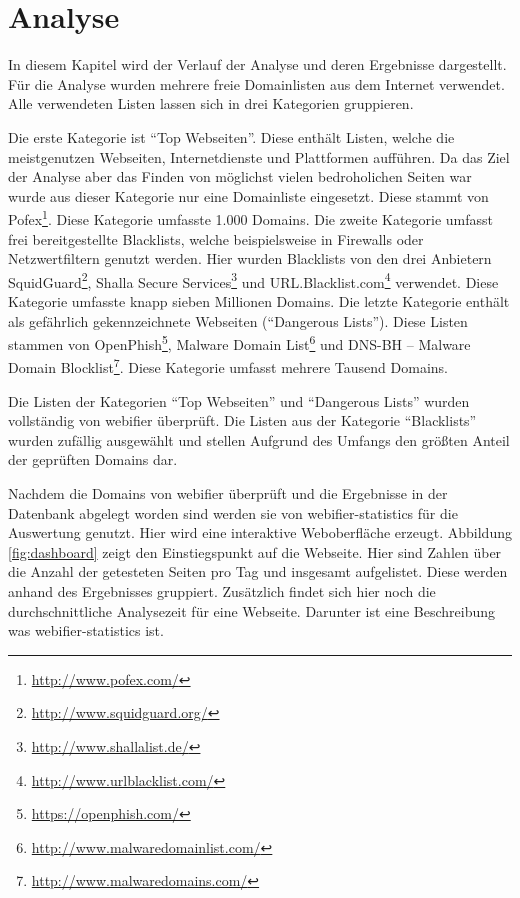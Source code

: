 \chapter{Analyse}

In diesem Kapitel wird der Verlauf der Analyse und deren Ergebnisse dargestellt. Für die Analyse wurden mehrere freie Domainlisten aus dem Internet verwendet. Alle verwendeten Listen lassen sich in drei Kategorien gruppieren.

Die erste Kategorie ist \enquote{Top Webseiten}. Diese enthält Listen, welche die meistgenutzen Webseiten, Internetdienste und Plattformen aufführen. Da das Ziel der Analyse aber das Finden von möglichst vielen bedroholichen Seiten war wurde aus dieser Kategorie nur eine Domainliste eingesetzt. Diese stammt von Pofex\footnote{\url{http://www.pofex.com/}}. Diese Kategorie umfasste 1.000 Domains. Die zweite Kategorie umfasst frei bereitgestellte Blacklists, welche beispielsweise in Firewalls oder Netzwertfiltern genutzt werden. Hier wurden Blacklists von den drei Anbietern SquidGuard\footnote{\url{http://www.squidguard.org/}}, Shalla Secure Services\footnote{\url{http://www.shallalist.de/}} und URL.Blacklist.com\footnote{\url{http://www.urlblacklist.com/}} verwendet. Diese Kategorie umfasste knapp sieben Millionen Domains. Die letzte Kategorie enthält als gefährlich gekennzeichnete Webseiten (\enquote{Dangerous Lists}). Diese Listen stammen von OpenPhish\footnote{\url{https://openphish.com/}}, Malware Domain List\footnote{\url{http://www.malwaredomainlist.com/}} und DNS-BH – Malware Domain Blocklist\footnote{\url{http://www.malwaredomains.com/}}. Diese Kategorie umfasst mehrere Tausend Domains.

Die Listen der Kategorien \enquote{Top Webseiten} und \enquote{Dangerous Lists} wurden vollständig von webifier überprüft. Die Listen aus der Kategorie \enquote{Blacklists} wurden zufällig ausgewählt und stellen Aufgrund des Umfangs den größten Anteil der geprüften Domains dar.

Nachdem die Domains von webifier überprüft und die Ergebnisse in der Datenbank abgelegt worden sind werden sie von webifier-statistics für die Auswertung genutzt. Hier wird eine interaktive Weboberfläche erzeugt. Abbildung \ref{fig:dashboard} zeigt den Einstiegspunkt auf die Webseite. Hier sind Zahlen über die Anzahl der getesteten Seiten pro Tag und insgesamt aufgelistet. Diese werden anhand des Ergebnisses gruppiert. Zusätzlich findet sich hier noch die durchschnittliche Analysezeit für eine Webseite. Darunter ist eine Beschreibung was webifier-statistics ist.

